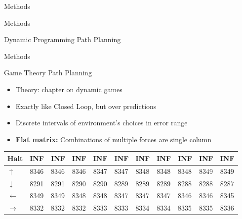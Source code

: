 \documentclass[xcolor=table, 9pt]{beamer}
\begin{document}
\begin{section}{Methods}
\begin{frame}{Methods}
\begin{block}{Dynamic Programming Path Planning}
        \end{block}
    \end{frame}
    \begin{frame}{Methods}
        \begin{block}{Game Theory Path Planning}
            \begin{itemize}
                \item Theory: chapter on dynamic games 
                \item Exactly like Closed Loop, but over predictions
                \item Discrete intervals of environment's choices in error range
                \item \textbf{Flat matrix:} Combinations of multiple forces are single column
            \end{itemize}
            \begin{table}[]
            \small
\begin{tabular}{|l|l|l|l|l|l|l|l|l|l|l|}
\hline            
Halt         & INF & INF & INF & INF & INF & INF & INF & INF & INF & INF \\
\hline
$\uparrow$    & 8346 & 8346 & 8346 & 8347 & 8347 & 8348 & 8348 & 8348 & 8349 & 8349 \\
\hline
$\downarrow$   & 8291 & 8291 & 8290 & 8290 & 8289 & 8289 & 8289 & 8288 & 8288 & 8287 \\
\hline
$\leftarrow$  & 8349 & 8349 & 8348 & 8348 & 8347 & 8347 & 8347 & 8346 & 8346 & 8345 \\
\hline
$\rightarrow$ & 8332 & 8332 & 8332 & 8333 & 8333 & 8334 & 8334 & 8335 & 8335 & 8336 \\
\hline


\end{tabular}
\end{table}
\end{block}
\end{frame}
\end{section}
\end{document}
